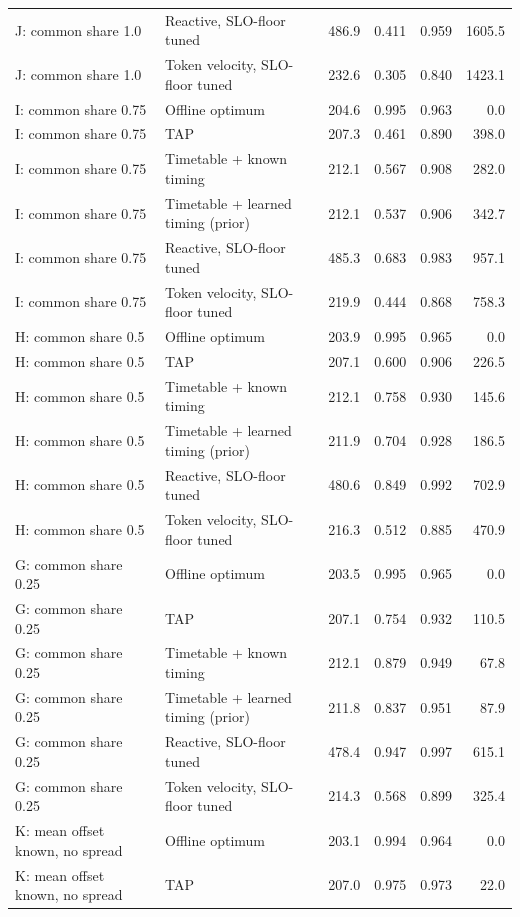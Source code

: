 \begin{tabular}{@{}llrrrr@{}}
J: common share 1.0 & Reactive, SLO-floor tuned & 486.9 & 0.411 & 0.959 & 1605.5 \\
J: common share 1.0 & Token velocity, SLO-floor tuned & 232.6 & 0.305 & 0.840 & 1423.1 \\
I: common share 0.75 & Offline optimum & 204.6 & 0.995 & 0.963 & 0.0 \\
I: common share 0.75 & TAP & 207.3 & 0.461 & 0.890 & 398.0 \\
I: common share 0.75 & Timetable + known timing & 212.1 & 0.567 & 0.908 & 282.0 \\
I: common share 0.75 & Timetable + learned timing (prior) & 212.1 & 0.537 & 0.906 & 342.7 \\
I: common share 0.75 & Reactive, SLO-floor tuned & 485.3 & 0.683 & 0.983 & 957.1 \\
I: common share 0.75 & Token velocity, SLO-floor tuned & 219.9 & 0.444 & 0.868 & 758.3 \\
H: common share 0.5 & Offline optimum & 203.9 & 0.995 & 0.965 & 0.0 \\
H: common share 0.5 & TAP & 207.1 & 0.600 & 0.906 & 226.5 \\
H: common share 0.5 & Timetable + known timing & 212.1 & 0.758 & 0.930 & 145.6 \\
H: common share 0.5 & Timetable + learned timing (prior) & 211.9 & 0.704 & 0.928 & 186.5 \\
H: common share 0.5 & Reactive, SLO-floor tuned & 480.6 & 0.849 & 0.992 & 702.9 \\
H: common share 0.5 & Token velocity, SLO-floor tuned & 216.3 & 0.512 & 0.885 & 470.9 \\
G: common share 0.25 & Offline optimum & 203.5 & 0.995 & 0.965 & 0.0 \\
G: common share 0.25 & TAP & 207.1 & 0.754 & 0.932 & 110.5 \\
G: common share 0.25 & Timetable + known timing & 212.1 & 0.879 & 0.949 & 67.8 \\
G: common share 0.25 & Timetable + learned timing (prior) & 211.8 & 0.837 & 0.951 & 87.9 \\
G: common share 0.25 & Reactive, SLO-floor tuned & 478.4 & 0.947 & 0.997 & 615.1 \\
G: common share 0.25 & Token velocity, SLO-floor tuned & 214.3 & 0.568 & 0.899 & 325.4 \\
K: mean offset known, no spread & Offline optimum & 203.1 & 0.994 & 0.964 & 0.0 \\
K: mean offset known, no spread & TAP & 207.0 & 0.975 & 0.973 & 22.0 \\

\end{tabular}
